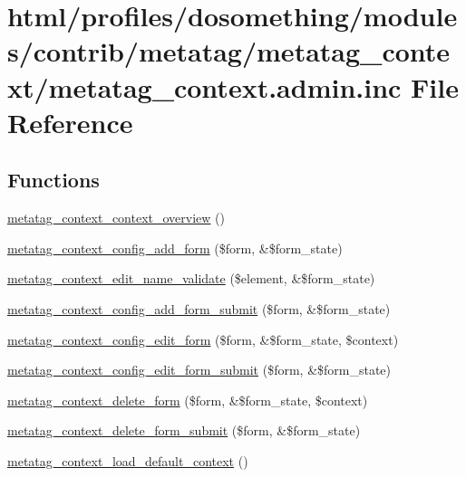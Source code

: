 \hypertarget{metatag__context_8admin_8inc}{
\section{html/profiles/dosomething/modules/contrib/metatag/metatag\_\-context/metatag\_\-context.admin.inc File Reference}
\label{metatag__context_8admin_8inc}
}
\subsection*{Functions}
\begin{DoxyCompactItemize}
\item 
\hyperlink{metatag__context_8admin_8inc_a8f131db71f23b23936394c1d4638a293}{metatag\_\-context\_\-context\_\-overview} ()
\item 
\hyperlink{metatag__context_8admin_8inc_a82ff4d2904af00379a2280f7f0cdc965}{metatag\_\-context\_\-config\_\-add\_\-form} (\$form, \&\$form\_\-state)
\item 
\hyperlink{metatag__context_8admin_8inc_a6fc25775002756ee7790b2c84df64f24}{metatag\_\-context\_\-edit\_\-name\_\-validate} (\$element, \&\$form\_\-state)
\item 
\hyperlink{metatag__context_8admin_8inc_a2e5def61d1d52defe8707c4f4f9c6bce}{metatag\_\-context\_\-config\_\-add\_\-form\_\-submit} (\$form, \&\$form\_\-state)
\item 
\hyperlink{metatag__context_8admin_8inc_aa80895a6822f4e8be8026ddb35d2c2fa}{metatag\_\-context\_\-config\_\-edit\_\-form} (\$form, \&\$form\_\-state, \$context)
\item 
\hyperlink{metatag__context_8admin_8inc_a5ab3d7c9c5d45ae4099922d89536caaa}{metatag\_\-context\_\-config\_\-edit\_\-form\_\-submit} (\$form, \&\$form\_\-state)
\item 
\hyperlink{metatag__context_8admin_8inc_a905543e7688e10eabe222fbd44ca9d16}{metatag\_\-context\_\-delete\_\-form} (\$form, \&\$form\_\-state, \$context)
\item 
\hyperlink{metatag__context_8admin_8inc_a7404b24889dc878c5e2b99073e97c7ef}{metatag\_\-context\_\-delete\_\-form\_\-submit} (\$form, \&\$form\_\-state)
\item 
\hyperlink{metatag__context_8admin_8inc_aac0873db0e0bc2432a0c467104d6299c}{metatag\_\-context\_\-load\_\-default\_\-context} ()
\end{DoxyCompactItemize}


